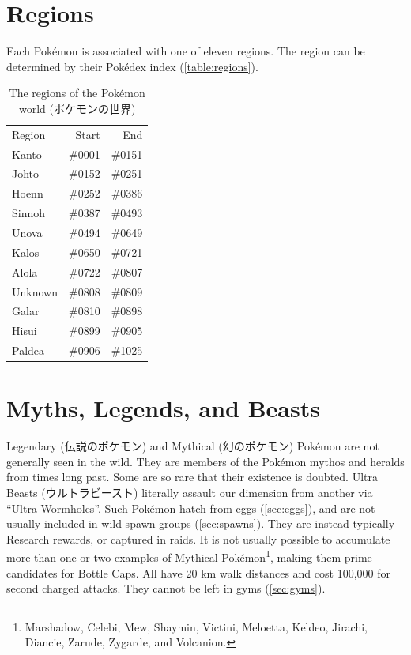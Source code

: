 \section{Regions}
\label{sec:regions}
Each Pokémon is associated with one of eleven regions.
The region can be determined by their Pokédex index (\autoref{table:regions}).
\begin{table}[ht]
  \begin{center}
    \begin{tabular}{lrr}
      Region & Start & End\\
      \Midrule
      Kanto & \#0001 & \#0151\\
      Johto & \#0152 & \#0251\\
      Hoenn & \#0252 & \#0386\\
      Sinnoh & \#0387 & \#0493\\
      Unova & \#0494 & \#0649\\
      Kalos & \#0650 & \#0721\\
      Alola & \#0722 & \#0807\\
      Unknown & \#0808 & \#0809\\
      Galar & \#0810 & \#0898\\
      Hisui & \#0899 & \#0905\\
      Paldea & \#0906 & \#1025\\
    \end{tabular}
  \end{center}
  \caption{The regions of the Pokémon world (\textjapanese{ポケモンの世界})}
  \label{table:regions}
\end{table}

\section{Myths, Legends, and Beasts}
\label{sec:myths}
Legendary (\textjapanese{伝説のポケモン}) and Mythical (\textjapanese{幻のポケモン}) Pokémon
 are not generally seen in the wild.
They are members of the Pokémon mythos and heralds from times long past.
Some are so rare that their existence is doubted.
Ultra Beasts (\textjapanese{ウルトラビースト}) literally assault our dimension from
  another via ``Ultra Wormholes''.
Such Pokémon hatch from eggs (\autoref{sec:eggs}), and are not usually included in wild spawn groups (\autoref{sec:spawns}).
They are instead typically Research rewards, or captured in raids.
It is not usually possible to accumulate more than one or two examples of Mythical
  Pokémon\footnote{Marshadow, Celebi, Mew, Shaymin, Victini, Meloetta, Keldeo,
  Jirachi, Diancie, Zarude, Zygarde, and Volcanion.}, making them prime
  candidates for Bottle Caps.
All have 20 km walk distances and cost 100,000 for second charged attacks.
They cannot be left in gyms (\autoref{sec:gyms}).

